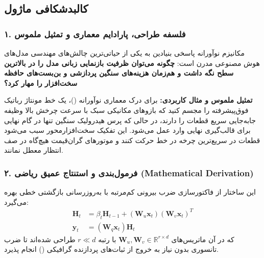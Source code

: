 \subsection{کالبدشکافی ماژول }

\subsubsection*{۱. فلسفه طراحی، پارادایم معماری و تمثیل ملموس}
مکانیزم نوآورانه  پاسخی بنیادین به یکی از حیاتی‌ترین چالش‌های مهندسی مدل‌های هوش مصنوعی مدرن است: \textbf{چگونه می‌توان ظرفیت بازنمایی زبانی مدل را در بالاترین سطح نگه داشت و هم‌زمان هزینه‌های سنگین پردازشی و بن‌بست‌های حافظه سخت‌افزار را مهار کرد؟}

\textbf{تمثیل ملموس و مثال کاربردی:}
برای درک معماری نوآورانه  ()، یک خط مونتاژ رباتیک فوق‌پیشرفته را مجسم کنید که بازوهای مکانیکی سبک با سرعت چرخش بالا وظیفه جابه‌جایی سریع قطعات را دارند، در حالی که پرس هیدرولیک سنگین تنها در گام نهایی برای قالب‌گیری نهایی وارد عمل می‌شود. این تفکیک سخت‌افزارمحور سبب می‌شود قطعات در سریع‌ترین چرخه در خط حرکت کنند و موتورهای گران‌قیمت هیچ‌گاه در صف انتظار معطل نمانند.

\subsubsection*{۲. فرمول‌بندی و استنتاج عمیق ریاضی (Mathematical Derivation)}
این ساختار از فاکتورسازی ضرب بیرونی کم‌مرتبه با به‌روزرسانی بازگشتی خطی بهره می‌گیرد:
\begin{align}
\mathbf{H}_t &= \beta_t \mathbf{H}_{t-1} + (\mathbf{W}_u \mathbf{x}_t) (\mathbf{W}_v \mathbf{x}_t)^T \\
\mathbf{y}_t &= (\mathbf{W}_q \mathbf{x}_t) \mathbf{H}_t
\end{align}
که در آن ماتریس‌های $\mathbf{W}_u, \mathbf{W}_v \in \mathbb{R}^{r \times d}$ با رتبه $r \ll d$ طراحی شده‌اند تا ضرب تانسوری بدون نیاز به خروج از ثبات‌های پردازنده گرافیکی () انجام پذیرد.

